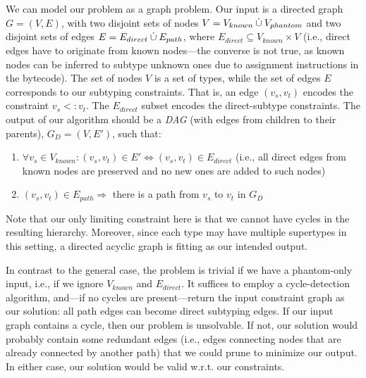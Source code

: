 We can model our problem as a graph problem. Our input is a directed
graph $G = (V,E)$, with two disjoint sets of nodes $V = V_{known} \mathbin{\dot{\cup}}
V_{phantom}$ and two disjoint sets of edges $E = E_{direct} \mathbin{\dot{\cup}}
E_{path}$, where $E_{direct} \subseteq V_{known} \times V$ (i.e.,
direct edges have to originate from known nodes---the converse is not
true, as known nodes can be inferred to subtype unknown ones due to
assignment instructions in the bytecode). The set of nodes $V$ is a
set of types, while the set of edges $E$ corresponds to our subtyping
constraints. That is, an edge $(v_s,v_t)$ encodes the constraint $v_s
<: v_t$. The $E_{direct}$ subset encodes the direct-subtype
constraints. The output of our algorithm should be a \emph{DAG} (with
edges from children to their parents), $G_D = (V,E')$, such that:
\begin{enumerate}
\item $\forall v_s \in V_{known}: (v_s,v_t) \in E' \Leftrightarrow (v_s,
 v_t) \in E_{direct}$ (i.e., all direct edges from known nodes are preserved
and no new ones are added to such nodes)
\item $(v_s,v_t) \in E_{path} \Rightarrow$ there is a path from $v_s$ to
$v_t$ in $G_D$
\end{enumerate}


Note that our only limiting constraint here is that we cannot have
cycles in the resulting hierarchy. Moreover, since each type may have
multiple supertypes in this setting, a directed acyclic graph is
fitting as our intended output.


In contrast to the general case, the problem is trivial if we have a
phantom-only input, i.e., if we ignore $V_{known}$ and
$E_{direct}$. It suffices to employ a cycle-detection algorithm,
and---if no cycles are present---return the input constraint graph as
our solution: all path edges can become direct subtyping edges. If our
input graph contains a cycle, then our problem is unsolvable.  If
not, our solution would probably contain some redundant edges (i.e.,
edges connecting nodes that are already connected by another path)
that we could prune to minimize our output. In either case, our
solution would be valid w.r.t. our constraints.

